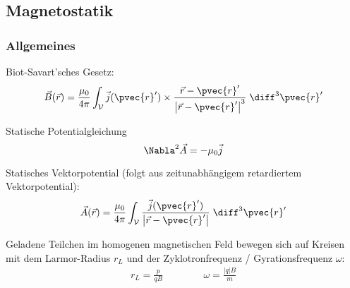 \documentclass[11pt]{article}
\numberwithin{equation}{section}
\begin{document}
    \subsection{Magnetostatik}
      \subsubsection{Allgemeines}
        Biot-Savart'sches Gesetz:
        \begin{equation}
          \vec{B}(\vec{r}) = \frac{\mu_0}{4\pi}\int_{\mathcal{V}} \vec{j}(\pvec{r}')\times\frac{\vec{r}-\pvec{r}'}{\left|\vec{r}-\pvec{r}'\right|^3}\;\diff^3\pvec{r}'
        \end{equation}

        Statische Potentialgleichung
        \begin{equation}
          \Nabla^2 \vec{A} = - \mu_0 \vec{j}
        \end{equation}

        Statisches Vektorpotential (folgt aus zeitunabhängigem retardiertem Vektorpotential):
        \begin{equation}
          \vec{A}(\vec{r}) = \frac{\mu_0}{4\pi} \int_{\mathcal{V}} \frac{\vec{j}(\pvec{r}')}{\left|\vec{r}-\pvec{r}'\right|} \;\diff^3\pvec{r}'
        \end{equation}

        Geladene Teilchen im homogenen magnetischen Feld bewegen sich auf Kreisen mit dem Larmor-Radius $r_L$ und der Zyklotronfrequenz / Gyrationsfrequenz $\omega$:
        \begin{equation}
          \begin{aligned}
            r_L = \frac{p}{qB} &&\hspace{30pt} %
            \omega = \frac{|q| B}{m}
          \end{aligned}
        \end{equation}
\end{document}
